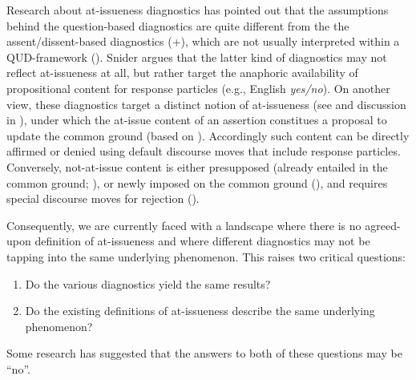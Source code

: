 \documentclass[times,linguex,xcolor]{glossa}
\begin{document}
  Research about at-issueness diagnostics has pointed out that the assumptions behind the question-based diagnostics are quite different from the the assent/dissent-based diagnostics (+), which are not usually interpreted within a QUD-framework (\citealt{snider_anaphoric_2017,snider_at-issuenessne_2017,snider_distinguishing_2018,koev_notions_2018,faller_discourse_2019,korotkova_evidential_2020}).
  Snider argues that the latter kind of diagnostics may not reflect at-issueness at all, but rather target the anaphoric availability of propositional content for response particles (e.g., English \emph{yes/no}).
  On another view, these diagnostics target a distinct notion of at-issueness (see \citealt{koev_notions_2018} and discussion in \citealt{faller_discourse_2019,korotkova_evidential_2020}), under which the at-issue content of an assertion constitues a proposal to update the common ground (based on \citealt{farkas_reacting_2010}). Accordingly such content can be directly affirmed or denied using default discourse moves that include response particles. Conversely, not-at-issue content is either presupposed (already entailed in the common ground; \citealt{stalnaker_presuppositions_1973,stalnaker_common_2002}), or newly imposed on the common ground (\citealt{murray_varieties_2014,anderbois_at-issue_2015}), and requires special discourse moves for rejection (\citealt{potts_logic_2005}).

  Consequently, we are currently faced with a landscape where there is no agreed-upon definition of at-issueness and where different diagnostics may not be tapping into the same underlying phenomenon. This raises two critical questions:

  \begin{enumerate}
    \item Do the various diagnostics yield the same results?
    \item Do the existing definitions of at-issueness describe the same underlying phenomenon?
  \end{enumerate}

\noindent Some research has suggested that the answers to both of these questions may be ``no''.
\end{document}
